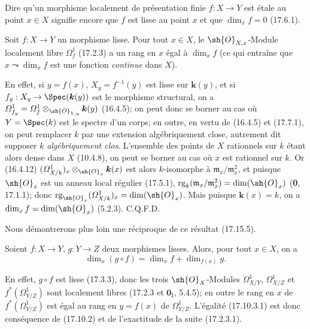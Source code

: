 Dire qu'un morphisme localement de présentation finie $f:X\to Y$ est étale au point $x\in X$ signifie encore que $f$ est lisse au point $x$ et que $\dim_x f=0$ (17.6.1).

\begin{proposition}[17.10.2]
\label{IV.17.10.2}
Soit $f:X\to Y$ un morphisme lisse. Pour tout $x\in X$, le $\sh{O}_{X,x}$-Module localement libre $\varOmega_f^1$ \textup{(17.2.3)} a un rang en $x$ égal à $\dim_x f$ \textup{(ce qui entraîne que $x\leadsto\dim_x f$ est une fonction \emph{continue} dans $X$)}.
\end{proposition}

En effet, si $y=f(x)$, $X_y=f^{-1}(y)$ est lisse sur $\boldsymbol{k}(y)$, et si $f_y:X_y\to\Spec(\boldsymbol{k}(y))$ est le morphisme structural, on a $\varOmega_{f_y}^1=\varOmega_f^1\otimes_{\sh{O}_{Y,y}}\boldsymbol{k}(y)$ (16.4.5); on peut donc se borner au cas où $Y=\Spec(k)$ est le spectre d'un corps; en outre, en vertu de (16.4.5) et (17.7.1), on peut remplacer $k$ par une extension algébriquement close, autrement dit
supposer $k$ \emph{algébriquement clos}. L'ensemble des points de $X$ rationnels sur $k$ étant alors dense dans $X$ (10.4.8), on peut se borner au cas où $x$ est rationnel sur $k$. Or (16.4.12) $(\varOmega^1_{X/k})_x\otimes_{\sh{O}_x}\boldsymbol{k}(x)$ est alors $k$-isomorphe à $\mathfrak m_x/\mathfrak m_x^2$, et puisque $\sh{O}_x$ est un anneau local régulier (17.5.1), $\operatorname{rg}_k(\mathfrak m_x/\mathfrak m_x^2)=\dim(\sh{O}_x)$ (\textbf{0}, 17.1.1); donc $\operatorname{rg}_{\sh{O}_x}(\varOmega^1_{X/k})_x=\dim(\sh{O}_x)$. Mais puisque $\boldsymbol{k}(x)=k$, on a $\dim_x f=\dim(\sh{O}_x)$ (5.2.3). C.Q.F.D.

Nous démontrerons plus loin une réciproque de ce résultat (17.15.5).

\begin{corollary}[17.10.3]
\label{IV.17.10.3}
Soient $f:X\to Y$, $g:Y\to Z$ deux morphismes lisses. Alors, pour tout $x\in X$, on a
\begin{equation}
\label{IV.17.10.3.1}
\tag{17.10.3.1}
\dim_x(g\circ f)=\dim_x f+\dim_{f(x)}g.
\end{equation}
\end{corollary}

En effet, $g\circ f$ est lisse (17.3.3), donc les trois $\sh{O}_X$-Modules $\varOmega^1_{X/Y}$, $\varOmega^1_{X/Z}$ et $f^*(\varOmega^1_{Y/Z})$ sont localement libres (17.2.3 et $\mathbf{0}_{\mathrm I}$, 5.4.5); en outre le rang en $x$ de $f^*(\varOmega^1_{Y/Z})$ est égal au rang en $y=f(x)$ de $\varOmega^1_{Y/Z}$. L'égalité (17.10.3.1) est donc conséquence de (17.10.2) et de l'exactitude de la suite (17.2.3.1).

